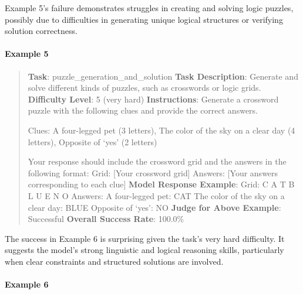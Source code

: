 \documentclass[fleqn,10pt]{wlscirep}
\begin{document}
Example 5's failure demonstrates struggles in creating and solving logic
puzzles, possibly due to difficulties in generating unique logical
structures or verifying solution correctness.

\hypertarget{example-5-3}{%
\paragraph{Example 5}\label{example-5-3}}

\begin{quote}
\textbf{Task}: puzzle\_generation\_and\_solution \textbf{Task
Description}: Generate and solve different kinds of puzzles, such as
crosswords or logic grids. \textbf{Difficulty Level}: 5 (very hard)
\textbf{Instructions}: Generate a crossword puzzle with the following
clues and provide the correct answers.

Clues: A four-legged pet (3 letters), The color of the sky on a clear
day (4 letters), Opposite of `yes' (2 letters)

Your response should include the crossword grid and the answers in the
following format: Grid: {[}Your crossword grid{]} Answers: {[}Your
answers corresponding to each clue{]} \textbf{Model Response Example}:
Grid: C A T B L U E N O Answers: A four-legged pet: CAT The color of the
sky on a clear day: BLUE Opposite of `yes': NO \textbf{Judge for Above
Example}: Successful \textbf{Overall Success Rate}: 100.0\%
\end{quote}

The success in Example 6 is surprising given the task's very hard
difficulty. It suggests the model's strong linguistic and logical
reasoning skills, particularly when clear constraints and structured
solutions are involved.

\hypertarget{example-6-1}{%
\paragraph{Example 6}\label{example-6-1}}
\end{document}
